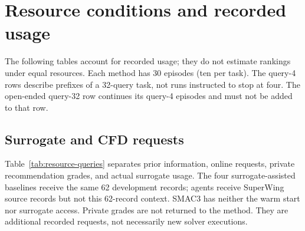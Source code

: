 \section{Resource conditions and recorded usage}
\label{app:resources}
The following tables account for recorded usage; they do not estimate rankings under equal resources. Each method has 30 episodes (ten per task). The query-4 rows describe prefixes of a 32-query task, not runs instructed to stop at four. The open-ended query-32 row continues its query-4 episodes and must not be added to that row.
\subsection{Surrogate and CFD requests}
Table~\ref{tab:resource-queries} separates prior information, online requests, private recommendation grades, and actual surrogate usage. The four surrogate-assisted baselines receive the same 62 development records; agents receive SuperWing source records but not this 62-record context. SMAC3 has neither the warm start nor surrogate access. Private grades are not returned to the method. They are additional recorded requests, not necessarily new solver executions.

